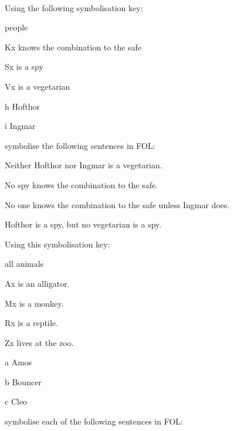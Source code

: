 \

\problempart
\label{pr.FOLvegetarians}
Using the following symbolisation key:
\begin{ekey}
\item[\text{domain}] people
\item[Kx]  knows the combination to the safe
\item[Sx]  is a spy
\item[Vx]  is a vegetarian
\item[h] Hofthor
\item[i] Ingmar
\end{ekey}
symbolise the following sentences in FOL:
\begin{earg}
\item Neither Hofthor nor Ingmar is a vegetarian.
\item No spy knows the combination to the safe.
\item No one knows the combination to the safe unless Ingmar does.
\item Hofthor is a spy, but no vegetarian is a spy.
\end{earg}
\solutions
\problempart\label{pr.FOLalligators}
Using this symbolisation key:
\begin{ekey}
\item[\text{domain}] all animals
\item[Ax]  is an alligator.
\item[Mx]  is a monkey.
\item[Rx]  is a reptile.
\item[Zx]  lives at the zoo.
\item[a] Amos
\item[b] Bouncer
\item[c] Cleo
\end{ekey}
symbolise each of the following sentences in FOL:
